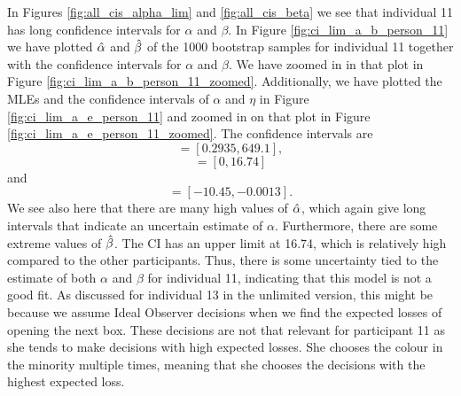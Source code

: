 In Figures \ref{fig:all_cis_alpha_lim} and \ref{fig:all_cis_beta} we see that individual 11 has long confidence intervals for $\alpha$ and $\beta$. In Figure \ref{fig:ci_lim_a_b_person_11} we have plotted $\hat{\alpha}$ and $\hat{\beta}$ of the 1000 bootstrap samples for individual 11 together with the confidence intervals for $\alpha$ and $\beta$.
We have zoomed in in that plot in Figure \ref{fig:ci_lim_a_b_person_11_zoomed}. Additionally, we have plotted the MLEs and the confidence intervals of $\alpha$ and $\eta$ in Figure \ref{fig:ci_lim_a_e_person_11} and zoomed in on that plot in Figure \ref{fig:ci_lim_a_e_person_11_zoomed}.
The confidence intervals are 
\begin{equation*}
    [\hat{\alpha}^{*(5)}_{1000},\hat{\alpha}^{*(95)}_{1000}] = [0.2935,649.1],
\end{equation*}
\begin{equation*}
    [\hb^{*(5)}_{1000},\hb^{*(95)}_{1000}] = [0,16.74]
\end{equation*}
and
\begin{equation*}
    [\hat{\eta}^{*(5)}_{1000},\hat{\eta}^{*(95)}_{1000}] = [-10.45,-0.0013].
\end{equation*}
We see also here that there are many high values of $\hat{\alpha}$, which again give long intervals that indicate an uncertain estimate of $\alpha$. Furthermore, there are some extreme values of $\hat{\beta}$. The CI has an upper limit at 16.74, which is relatively high compared to the other participants. Thus, there is some uncertainty tied to the estimate of both $\alpha$ and $\beta$ for individual 11, indicating that this model is not a good fit. As discussed for individual 13 in the unlimited version, this might be because we assume Ideal Observer decisions when we find the expected losses of opening the next box. These decisions are not that relevant for participant 11 as she tends to make decisions with high expected losses. She chooses the colour in the minority multiple times, meaning that she chooses the decisions with the highest expected loss. 
